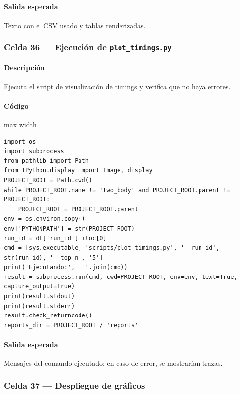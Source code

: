\paragraph{Salida esperada} Texto con el CSV usado y tablas renderizadas.

\subsubsection*{Celda 36 — Ejecución de \texttt{plot\_timings.py}}
\paragraph{Descripción} Ejecuta el script de visualización de timings y verifica que no haya errores.
\paragraph{Código}
\begin{listing}[H]
\caption{Celda 36: generación de gráficas de timings}
\begin{adjustbox}{max width=\textwidth}
\begin{minipage}{\textwidth}
\begin{verbatim}
import os
import subprocess
from pathlib import Path
from IPython.display import Image, display
PROJECT_ROOT = Path.cwd()
while PROJECT_ROOT.name != 'two_body' and PROJECT_ROOT.parent != PROJECT_ROOT:
    PROJECT_ROOT = PROJECT_ROOT.parent
env = os.environ.copy()
env['PYTHONPATH'] = str(PROJECT_ROOT)
run_id = df['run_id'].iloc[0]
cmd = [sys.executable, 'scripts/plot_timings.py', '--run-id', str(run_id), '--top-n', '5']
print('Ejecutando:', ' '.join(cmd))
result = subprocess.run(cmd, cwd=PROJECT_ROOT, env=env, text=True, capture_output=True)
print(result.stdout)
print(result.stderr)
result.check_returncode()
reports_dir = PROJECT_ROOT / 'reports'
\end{verbatim}
\end{minipage}
\end{adjustbox}
\end{listing}
\paragraph{Salida esperada} Mensajes del comando ejecutado; en caso de error, se mostrarían trazas.


\subsubsection*{Celda 37 — Despliegue de gráficos}

